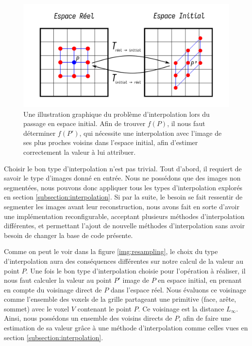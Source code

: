 {{{            \begin{figure}[h]
                \centering
                \includegraphics[width=.9\linewidth]{img/tetmesh_representation.png}
                \caption{Une illustration graphique du problème d'interpolation lors du passage en espace initial. Afin de trouver $f(P)$, il nous faut déterminer $f(P')$, qui nécessite une interpolation avec l'image de ses plus proches voisins dans l'espace initial, afin d'estimer correctement la valeur à lui attribuer.}
                \label{img:coordinate_change_interpolation_neighbor}
            \end{figure}

            Choisir le bon type d'interpolation n'est pas trivial. Tout d'abord, il requiert de savoir le type d'images donné en entrée. Nous ne possédons que des images non segmentées, nous pouvons donc appliquer tous les types d'interpolation explorés en section \ref{subsection:interpolation}. Si par la suite, le besoin se fait ressentir de segmenter les images avant leur reconstruction, nous avons fait en sorte d'avoir une implémentation reconfigurable, acceptant plusieurs méthodes d'interpolation différentes, et permettant l'ajout de nouvelle méthodes d'interpolation sans avoir besoin de changer la base de code présente.

            Comme on peut le voir dans la figure \ref{img:resampling}, le choix du type d'interpolation aura des conséquences différentes sur notre calcul de la valeur au point $P$. Une fois le bon type d'interpolation choisie pour l'opération à réaliser, il nous faut calculer la valeur au point $P'$ image de $P$ en espace initial, en prenant en compte du voisinage direct de $P$ dans l'espace réel. Nous évaluons ce voisinage comme l'ensemble des voxels de la grille partageant une primitive (face, arête, sommet) avec le voxel $V$ contenant le point $P$. Ce voisinage est la distance $L_\infty$. Ainsi, nous possédons un ensemble des voisins directs de $P$, afin de faire une estimation de sa valeur grâce à une méthode d'interpolation comme celles vues en section \ref{subsection:interpolation}.

}}}
